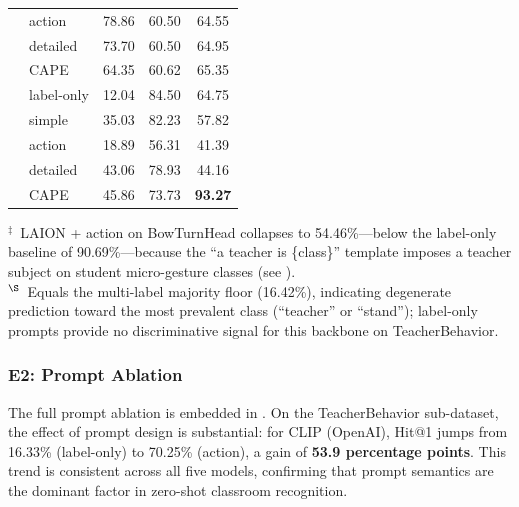 \documentclass[electronics,article,submit,pdftex,moreauthors]{Definitions/mdpi}
\begin{document}
\begin{table}[H]
\begin{tabular}{ll ccc}
 & action & 78.86 & 60.50 & 64.55 \\
 & detailed & 73.70 & 60.50 & 64.95 \\
 & CAPE & 64.35 & 60.62 & 65.35 \\
\addlinespace
\multirow{5}{*}{DFN-CLIP}
 & label-only & 12.04 & 84.50 & 64.75 \\
 & simple & 35.03 & 82.23 & 57.82 \\
 & action & 18.89 & 56.31 & 41.39 \\
 & detailed & 43.06 & 78.93 & 44.16 \\
 & CAPE & 45.86 & 73.73 & \textbf{93.27} \\
\bottomrule
\end{tabular}
\noindent\footnotesize $^{\ddagger}$~LAION + action on BowTurnHead collapses to 54.46\%---below the label-only baseline of 90.69\%---because the ``a teacher is \{class\}'' template imposes a teacher subject on student micro-gesture classes (see ).\\
$^{\S}$~Equals the multi-label majority floor (16.42\%), indicating degenerate prediction toward the most prevalent class (``teacher'' or ``stand''); label-only prompts provide no discriminative signal for this backbone on TeacherBehavior.
\end{table}

\subsubsection{E2: Prompt Ablation}
\label{sec:e2}

The full prompt ablation is embedded in .
On the TeacherBehavior sub-dataset, the effect of prompt design is substantial: for CLIP (OpenAI), Hit@1 jumps from 16.33\% (label-only) to 70.25\% (action), a gain of \textbf{53.9 percentage points}.
This trend is consistent across all five models, confirming that prompt semantics are the dominant factor in zero-shot classroom recognition.
\end{document}
